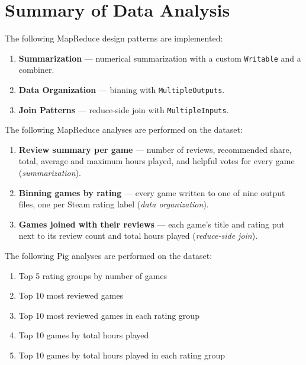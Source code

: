 \documentclass[11pt,a4paper]{article}
\newcommand{\code}[1]{\texttt{#1}}
\begin{document}
\section{Summary of Data Analysis}

The following MapReduce design patterns are implemented:

\begin{enumerate}
  \item \textbf{Summarization} — numerical summarization with a custom \code{Writable} and a combiner.
  \item \textbf{Data Organization} — binning with \code{MultipleOutputs}.
  \item \textbf{Join Patterns} — reduce-side join with \code{MultipleInputs}.
\end{enumerate}

The following MapReduce analyses are performed on the dataset:

\begin{enumerate}
  \item \textbf{Review summary per game} — number of reviews, recommended share, total, average and
        maximum hours played, and helpful votes for every game (\emph{summarization}).
  \item \textbf{Binning games by rating} — every game written to one of nine output files, one per
        Steam rating label (\emph{data organization}).
  \item \textbf{Games joined with their reviews} — each game's title and rating put next to its review
        count and total hours played (\emph{reduce-side join}).
\end{enumerate}

The following Pig analyses are performed on the dataset:

\begin{enumerate}
  \item Top 5 rating groups by number of games
  \item Top 10 most reviewed games
  \item Top 10 most reviewed games in each rating group
  \item Top 10 games by total hours played
  \item Top 10 games by total hours played in each rating group
\end{enumerate}

\end{document}
